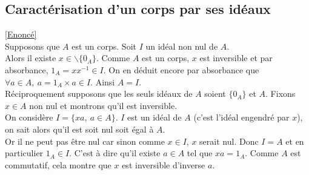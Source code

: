 \documentclass[8pt]{book}
\begin{document}
	\subsection{Caractérisation d'un corps par ses idéaux }
	\label{Caractérisation d'un corps par ses idéaux corrigé}
	\label{Idéaux d'un corps}
	\textcolor{blue}{\hyperref[Caractérisation d'un corps par ses idéaux]{[Enoncé]}}\\
	Supposons que $A$ est un corps. Soit $I$ un idéal non nul de $A$.\\
	Alors il existe $x\in \backslash\{0_A\}$. Comme $A$ est un corps, $x$ est inversible et par absorbance, $1_A=xx^{-1}\in I$. On en déduit encore par absorbance que $\forall a\in A,\ a=1_A\times a\in I$. Ainsi $A=I$.\\
	Réciproquement supposons que les seuls idéaux de $A$ soient $\{0_A\}$ et $A$. Fixons $x\in A$ non nul et montrons qu'il est inversible.\\
	On considère $I=\{xa,\ a\in A\}$. $I$ est un idéal de $A$ (c'est l'idéal engendré par $x$), on sait alors qu'il est soit nul soit égal à $A$.\\
	Or il ne peut pas être nul car sinon comme $x\in I$, $x$ serait nul. Donc $I=A$ et en particulier $1_A\in I$. C'est à dire qu'il existe $a\in A$ tel que $xa=1_A$. Comme $A$ est commutatif, cela montre que $x$ est inversible d'inverse $a$.
	
\end{document}
